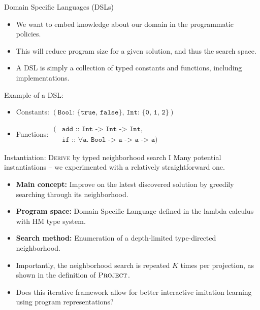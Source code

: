 \begin{frame}{Domain Specific Languages (DSLs)}
    \begin{itemize}
        \item We want to embed knowledge about our domain in the programmatic policies.
        \item This will reduce program size for a given solution, and thus the search space.
        \item A DSL is simply a collection of typed constants and functions, including implementations.
    \end{itemize}
    Example of a DSL:
    \begin{itemize}
        \item Constants: $(\texttt{Bool: \{true, false\}, Int: \{0, 1, 2\}})$
        \item Functions: $\begin{aligned}
            (&\texttt{add :: Int -> Int -> Int}, \\
             &\texttt{if :: $\forall$a. Bool -> a -> a -> a})
        \end{aligned}$
    \end{itemize}
\end{frame}

\note[itemize]{
    \item 
}

\begin{frame}{Instantiation: \textsc{Derive} by typed neighborhood search I}
    Many potential instantiations -- we experimented with a relatively straightforward one.
    \begin{itemize}
        \item \textbf{Main concept:} Improve on the latest discovered solution by greedily searching through its neighborhood.
        \item \textbf{Program space:} Domain Specific Language defined in the lambda calculus with HM type system.
        \item \textbf{Search method:} Enumeration of a depth-limited type-directed neighborhood.
        \item Importantly, the neighborhood search is repeated $K$ times per projection, as shown in the definition of $\textsc{Project}$.
        \item Does this iterative framework allow for better interactive imitation learning using program representations?
    \end{itemize}
\end{frame}


